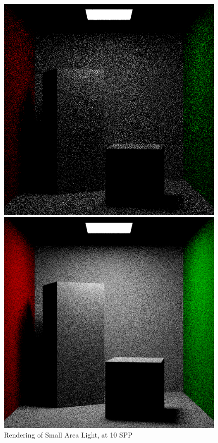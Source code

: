 \documentclass[a4paper]{myarticle}
\begin{document}
\begin{figure}[H]
  \begin{minipage}[t]{.3\textwidth}
      \centering
      \includegraphics[width=\textwidth]{q3/small_1_10.png}
      \caption{Rendering of Small Area Light, at 10 SPP}
  \end{minipage}
  \hfill
  \begin{minipage}[t]{.3\textwidth}
      \centering
      \includegraphics[width=\textwidth]{q3/small_1_100.png}

\end{minipage}
\end{figure}
\end{document}
